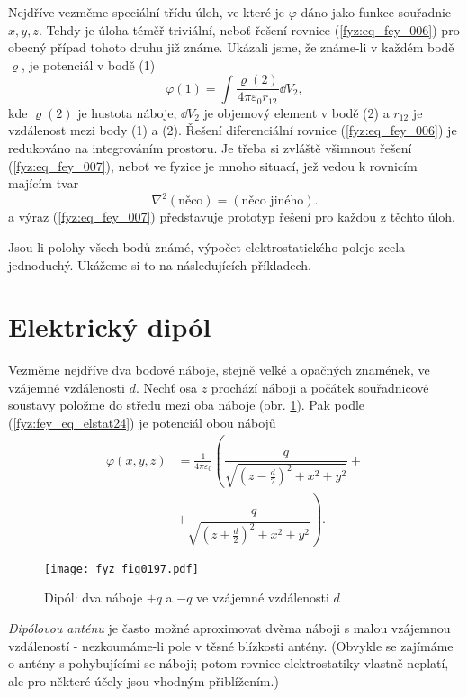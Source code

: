   Nejdříve vezměme speciální třídu úloh, ve které je \(\varphi\) dáno jako funkce souřadnic \(x, 
  y, z\). Tehdy je úloha téměř triviální, neboť řešení rovnice (\ref{fyz:eq_fey_006}) pro obecný 
  případ tohoto druhu již známe. Ukázali jsme, že známe-li v každém bodě \(\varrho\), je 
  potenciál v bodě (1)
  \begin{equation}\label{fyz:eq_fey_007}
  \varphi(1) = \int{\dfrac{\varrho(2)}{4\pi\varepsilon_0r_{12}}}\dd{V_2},
  \end{equation}
  kde \(\varrho(2)\) je hustota náboje, \(\dd{V_2}\) je objemový element v bodě (2) a \(r_{12}\) je
  vzdálenost mezi body (1) a (2). Řešení diferenciální rovnice (\ref{fyz:eq_fey_006}) je redukováno
  na integrováním prostoru. Je třeba si zvláště všimnout řešení (\ref{fyz:eq_fey_007}), neboť ve
  fyzice je mnoho situací, jež vedou k rovnicím majícím tvar
  \begin{equation}\label{fyz:eq_fey_008}
  \nabla^2(\text{něco}) = (\text{něco jiného}).
  \end{equation}
  a výraz (\ref{fyz:eq_fey_007}) představuje prototyp řešení pro každou z těchto úloh.
  
  Jsou-li polohy všech bodů známé, výpočet elektrostatického poleje zcela jednoduchý. Ukážeme si to
  na následujících příkladech.

\section{Elektrický dipól}\label{fyz:IIchapVsecXI}
  Vezměme nejdříve dva bodové náboje, stejně velké a opačných znamének, ve vzájemné vzdálenosti
  \(d\). Nechť osa \(z\) prochází náboji a počátek souřadnicové soustavy položme do středu mezi oba
  náboje (obr. \ref{fyz:fig0197}). Pak podle (\ref{fyz:fey_eq_elstat24}) je potenciál obou nábojů
  \begin{align}
    \varphi(x,y,z) 
      &= \frac{1}{4\pi\varepsilon_0}
         \left(\dfrac{q}{\sqrt{(z -\frac{d}{2})^2+x^2+y^2}} + \right.    \nonumber \\         
      &+ \left.\dfrac{-q}{\sqrt{(z+\frac{d}{2})^2+x^2+y^2}}\right).      \label{fyz:eq_fey_009}
  \end{align}
  \begin{figure}[ht!] %
    \centering
    \texttt{[image: fyz\_fig0197.pdf]}
    \caption{Dipól: dva náboje \(+q\) a \(-q\) ve vzájemné vzdálenosti \(d\)}
    \label{fyz:fig0197}
  \end{figure}
  \emph{Dipólovou anténu} je často možné aproximovat dvěma náboji s malou vzájemnou vzdáleností -
  nezkoumáme-li pole v těsné blízkosti antény. (Obvykle se zajímáme o antény s pohybujícími se
  náboji; potom rovnice elektrostatiky vlastně neplatí, ale pro některé účely jsou vhodným
  přiblížením.)
  
